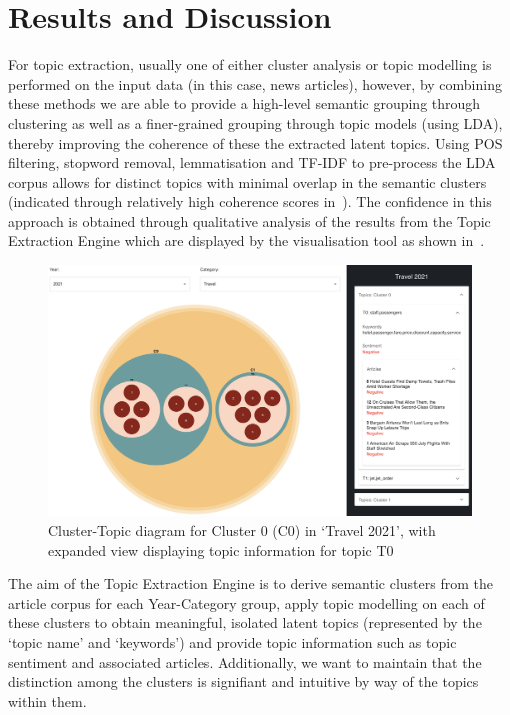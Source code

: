 \section{Results and Discussion}

For topic extraction, usually one of either cluster analysis or topic modelling is performed on the input data (in this case, news articles), however, by combining these methods we are able to provide a high-level semantic grouping through clustering as well as a finer-grained grouping through topic models (using LDA), thereby improving the coherence of these the extracted latent topics. Using POS filtering, stopword removal, lemmatisation and TF-IDF to pre-process the LDA corpus allows for distinct topics with minimal overlap in the semantic clusters (indicated through relatively high coherence scores in~). The confidence in this approach is obtained through qualitative analysis of the results from the Topic Extraction Engine which are displayed by the visualisation tool as shown in~.
\vspace{-1ex}
\begin{figure}[H]
  \centering
  \includegraphics[width=0.93\linewidth]{images/travel2021_topics_cropped.png}
  \caption{Cluster-Topic diagram for Cluster 0 (C0) in `Travel 2021', with expanded view displaying topic information for topic T0}
  \label{fig:topics_travel2021}
\end{figure}

The aim of the Topic Extraction Engine is to derive semantic clusters from the article corpus for each Year-Category group, apply topic modelling on each of these clusters to obtain meaningful, isolated latent topics (represented by the `topic name' and `keywords') and provide topic information such as topic sentiment and associated articles. Additionally, we want to maintain that the distinction among the clusters is signifiant and intuitive by way of the topics within them.  

